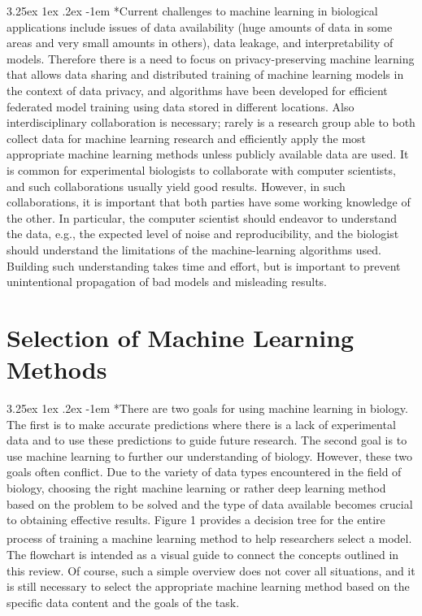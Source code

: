 \documentclass{article}
\makeatletter
\renewcommand\paragraph{\@startsection{paragraph}{4}{\z@}%
	{3.25ex \@plus1ex \@minus.2ex}%
	{-1em}%
	{\normalfont\normalsize}}
\makeatother
\begin{document}
		\paragraph*{Current challenges to machine learning in biological applications include issues of data availability (huge amounts of data in some areas and very small amounts in others), data leakage, and interpretability of models. Therefore there is a need to focus on privacy-preserving machine learning that allows data sharing and distributed training of machine learning models in the context of data privacy, and algorithms have been developed for efficient federated model training using data stored in different locations. Also interdisciplinary collaboration is necessary; rarely is a research group able to both collect data for machine learning research and efficiently apply the most appropriate machine learning methods unless publicly available data are used. It is common for experimental biologists to collaborate with computer scientists, and such collaborations usually yield good results. However, in such collaborations, it is important that both parties have some working knowledge of the other. In particular, the computer scientist should endeavor to understand the data, e.g., the expected level of noise and reproducibility, and the biologist should understand the limitations of the machine-learning algorithms used. Building such understanding takes time and effort, but is important to prevent unintentional propagation of bad models and misleading results.}
		
		\section*{Selection of Machine Learning Methods}
		
		\paragraph*{There are two goals for using machine learning in biology. The first is to make accurate predictions where there is a lack of experimental data and to use these predictions to guide future research. The second goal is to use machine learning to further our understanding of biology. However, these two goals often conflict. Due to the variety of data types encountered in the field of biology, choosing the right machine learning or rather deep learning method based on the problem to be solved and the type of data available becomes crucial to obtaining effective results. Figure 1 provides a decision tree for the entire process of training a machine learning method to help researchers select a model\textsuperscript{\cite{ref5}}. The flowchart is intended as a visual guide to connect the concepts outlined in this review. Of course, such a simple overview does not cover all situations, and it is still necessary to select the appropriate machine learning method based on the specific data content and the goals of the task.}
		
\end{document}
